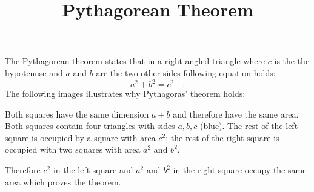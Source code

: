\documentclass[a4paper,11pt]{article}
\begin{document}
\pagestyle{empty}
    \title{Pythagorean Theorem}
    \maketitle\thispagestyle{empty}

    The Pythagorean theorem states that in a right-angled triangle where $c$ is
    the the hypotenuse and $a$ and $b$ are the two other sides following
    equation holds:
    \[
        a^2 + b^2 = c^2 \quad .
    \]
    The following images illustrates why Pythagoras' theorem holds:

    \begin{figure}[h]
        \centering
        
    \end{figure}

    Both squares have the same dimension $a+b$ and therefore have the same
    area. Both squares contain four triangles with sides $a,b,c$ (blue).
    The rest of the left square is occupied by a square with area $c^2$; the
    rest of the right square is occupied with two squares with area $a^2$ and
    $b^2$.

    Therefore $c^2$ in the left square and $a^2$ and $b^2$ in the right square
    occupy the same area which proves the theorem.
    
\end{document}
